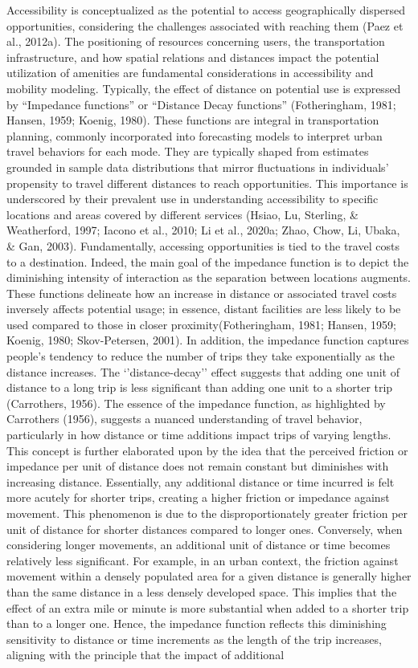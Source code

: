 \documentclass[12pt,twoside]{reedthesis}
\begin{document}
Accessibility is conceptualized as the potential to access geographically dispersed opportunities, considering the challenges associated with reaching them (Paez et al., 2012a). The positioning of resources concerning users, the transportation infrastructure, and how spatial relations and distances impact the potential utilization of amenities are fundamental considerations in accessibility and mobility modeling. Typically, the effect of distance on potential use is expressed by ``Impedance functions'' or ``Distance Decay functions'' (Fotheringham, 1981; Hansen, 1959; Koenig, 1980). These functions are integral in transportation planning, commonly incorporated into forecasting models to interpret urban travel behaviors for each mode. They are typically shaped from estimates grounded in sample data distributions that mirror fluctuations in individuals' propensity to travel different distances to reach opportunities. This importance is underscored by their prevalent use in understanding accessibility to specific locations and areas covered by different services (Hsiao, Lu, Sterling, \& Weatherford, 1997; Iacono et al., 2010; Li et al., 2020a; Zhao, Chow, Li, Ubaka, \& Gan, 2003). Fundamentally, accessing opportunities is tied to the travel costs to a destination. Indeed, the main goal of the impedance function is to depict the diminishing intensity of interaction as the separation between locations augments. These functions delineate how an increase in distance or associated travel costs inversely affects potential usage; in essence, distant facilities are less likely to be used compared to those in closer proximity(Fotheringham, 1981; Hansen, 1959; Koenig, 1980; Skov-Petersen, 2001). In addition, the impedance function captures people's tendency to reduce the number of trips they take exponentially as the distance increases. The `'distance-decay'' effect suggests that adding one unit of distance to a long trip is less significant than adding one unit to a shorter trip (Carrothers, 1956). The essence of the impedance function, as highlighted by Carrothers (1956), suggests a nuanced understanding of travel behavior, particularly in how distance or time additions impact trips of varying lengths. This concept is further elaborated upon by the idea that the perceived friction or impedance per unit of distance does not remain constant but diminishes with increasing distance. Essentially, any additional distance or time incurred is felt more acutely for shorter trips, creating a higher friction or impedance against movement. This phenomenon is due to the disproportionately greater friction per unit of distance for shorter distances compared to longer ones. Conversely, when considering longer movements, an additional unit of distance or time becomes relatively less significant. For example, in an urban context, the friction against movement within a densely populated area for a given distance is generally higher than the same distance in a less densely developed space. This implies that the effect of an extra mile or minute is more substantial when added to a shorter trip than to a longer one. Hence, the impedance function reflects this diminishing sensitivity to distance or time increments as the length of the trip increases, aligning with the principle that the impact of additional 
\end{document}
